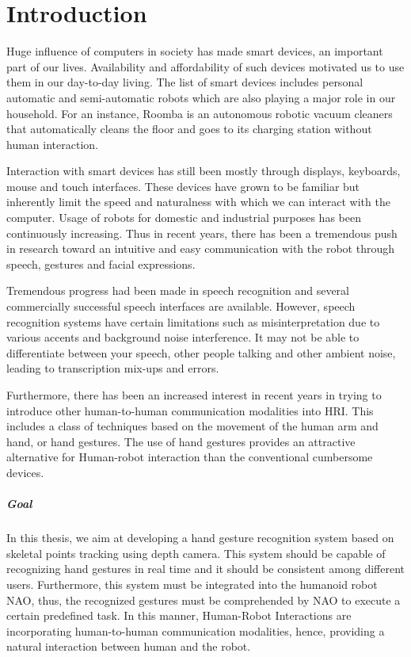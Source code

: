 \chapter{Introduction}
Huge influence of computers in society has made smart devices, an important part of our lives. Availability and affordability of such devices motivated us to use them in our day-to-day living. The list of smart devices includes personal automatic and semi-automatic robots which are also playing a major role in our household. For an instance, Roomba \cite{8} is an autonomous robotic vacuum cleaners that automatically cleans the floor and goes to its charging station without human interaction.

Interaction with smart devices has still been mostly through displays, keyboards, mouse and touch interfaces. These devices have grown to be familiar but inherently limit the speed and naturalness with which we can interact with the computer.  Usage of robots for domestic and industrial purposes has been continuously increasing. Thus in recent years, there has been a tremendous push in research toward an intuitive and easy communication with the robot through speech, gestures and facial expressions.

Tremendous progress had been made in speech recognition and several commercially successful speech interfaces are available. However, speech recognition systems have certain limitations such as misinterpretation due to various accents and background noise interference. It may not be able to differentiate between your speech, other people talking and other ambient noise, leading to transcription mix-ups and errors.

Furthermore, there has been an increased interest in recent years in trying to introduce other human-to-human communication modalities into HRI. This includes a class of techniques based on the movement of the human arm and hand, or hand gestures. The use of hand gestures provides an attractive alternative for Human-robot interaction than the conventional cumbersome devices.

\paragraph*{Goal} In this thesis, we aim at developing a hand gesture recognition system based on skeletal points tracking using depth camera. This system should be capable of recognizing hand gestures in real time and it should be consistent among different users. Furthermore, this system must be integrated into the humanoid robot NAO, thus, the recognized gestures must be comprehended by NAO to execute a certain predefined task. In this manner, Human-Robot Interactions are incorporating human-to-human communication modalities, hence, providing a natural interaction between human and the robot.

